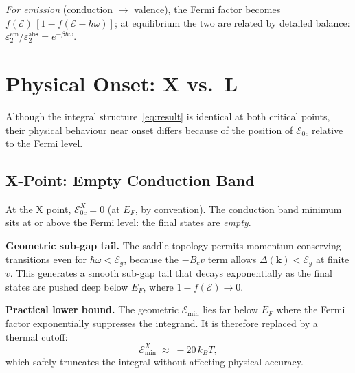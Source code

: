 \documentclass[11pt, a4paper]{article}
\newcommand{\E}{\mathcal{E}}
\newcommand{\Eoc}{\E_{0c}}
\newcommand{\Eg}{\E_g}
\newcommand{\Emin}{\E_{\min}}
\newcommand{\hw}{\hbar\omega}
\begin{document}
\emph{For emission} (conduction $\to$ valence), the Fermi factor becomes $f(\E)\,[1 - f(\E - \hw)]$; at equilibrium the two are related by detailed balance: $\varepsilon_2^{\mathrm{em}} / \varepsilon_2^{\mathrm{abs}} = e^{-\beta\hw}$.

\section{Physical Onset: X vs.\ L}

Although the integral structure~\eqref{eq:result} is identical at both critical points, their physical behaviour near onset differs because of the position of $\Eoc$ relative to the Fermi level.

\vspace{0.3cm}
\noindent
\begin{minipage}[t]{0.47\textwidth}
\vspace{0pt}
\subsection*{X-Point: Empty Conduction Band}

At the X point, $\Eoc^X = 0$ (at $E_F$, by convention). The conduction band minimum sits at or above the Fermi level: the final states are \emph{empty}.

\textbf{Geometric sub-gap tail.} The saddle topology permits momentum-conserving transitions even for $\hw < \Eg$, because the $-B_c v$ term allows $\Delta(\mathbf{k}) < \Eg$ at finite $v$. This generates a smooth sub-gap tail that decays exponentially as the final states are pushed deep below $E_F$, where $1 - f(\E) \to 0$.

\textbf{Practical lower bound.} The geometric $\Emin$ lies far below $E_F$ where the Fermi factor exponentially suppresses the integrand. It is therefore replaced by a thermal cutoff:
\begin{equation*}
    \Emin^X \;\approx\; -20\,k_BT,
\end{equation*}
which safely truncates the integral without affecting physical accuracy.
\end{minipage}%
\hfill\vrule\hfill%
\end{document}
